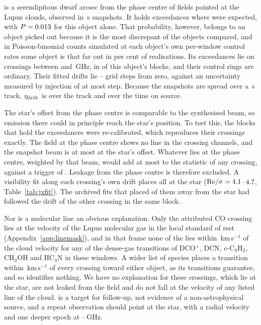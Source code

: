 \BkAlmaName{} is a serendipitous dwarf \TwPbJx{} arcsec from the phase
centre of fields pointed at the Lupus clouds, observed in \TwOnSrcJx\,s
snapshots. It holds \TwNExcJx{} exceedances where \TwExpCtrlJx{} were
expected, with $P=0.013$ for this object alone. That probability,
however, belongs to an object picked out because it is the most discrepant of
the \TwLookNStarCtrl{} objects compared, and in Poisson-binomial counts
simulated at each object's own per-window control rates some object is that
far out in \TwLookPctCtrl{} per cent of realisations. Its
\TwNExcJxWord{} exceedances lie on \TwJxNCrossExcWord{} crossings between
\TwJxExcBandLo{} and \TwJxExcBandHi\,GHz, in \TwJxNBlockExcWord{} of this
object's \TwJxNBlockWord{} blocks, and their control rings are ordinary.
Their fitted drifts lie \TwJxStepLo--\TwJxStepHi{} grid steps from zero,
against an uncertainty measured by injection of at most \TwJxStepErr{} step.
Because the snapshots are spread over a \TwJxSpanS\,s track,
$\eta_{\rm drift}$ is \TwJxEtaSpanRange{} over the track and \TwJxEtaOnRange{}
over the time on source.

The star's offset from the phase centre is comparable to the synthesised
beam, so emission there could in principle reach the star's position. To test this, the
\TwJxNBlockExcWord{} blocks that hold the exceedances were re-calibrated,
which reproduces their \TwJxNCrossExcWord{} crossings exactly. The field at
the phase centre shows no line in the crossing channels, and the snapshot beam
is at most \JrBeamAbsMax{} at the star's offset. Whatever lies at the phase
centre, weighted by that beam, would add at most \JrLeakTMax{} to the
statistic of any crossing, against a trigger of \StageNullTrig. Leakage from the phase
centre is therefore excluded. A visibility fit along each crossing's own drift places
all \TwJxNCrossExcWord{} at the star (${\rm Re}/\sigma=4.1$--$4.7$,
Table~\ref{tab:jxfit}). The archived fits that placed
\JrVfNWrongDriftWord{} of them away from the star had followed the drift of
the other crossing in the same block.

Nor is a molecular line an obvious explanation. Only the attributed CO
crossing lies at the velocity of the Lupus molecular gas in the local
standard of rest (Appendix~\ref{app:linemask}), and in that frame none of
the \TwJxNCrossExcWord{} lies within \JqLineMinDv\,km\,s$^{-1}$ of the cloud velocity for
any of the \JqLineNList{} dense-gas transitions of DCO$^+$, DCN,
c-C$_3$H$_2$, CH$_3$OH and HC$_3$N in these windows. A wider list of
\TwWideNSpecies{} species places a transition within
\TwWideDvMax\,km\,s$^{-1}$ of every crossing toward either object, as its
\TwWideNTrans{} transitions guarantee, and so identifies nothing. We have no
explanation for these crossings, which lie at the star, are not leaked from
the field and do not fall at the velocity of any listed line of the cloud.
\BkAlmaName{} is a target for follow-up, not evidence of a
non-astrophysical source, and a repeat observation should point at the
star, with a radial velocity and one deeper epoch at
\TwJxExcBandLo--\TwJxExcBandHi\,GHz.


